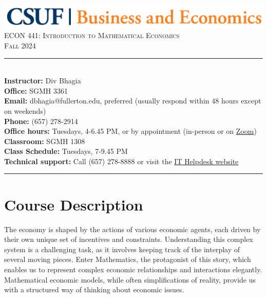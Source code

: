 \documentclass{./../Latex/syllabus}
\begin{document}
\begin{center}
\includegraphics[scale=0.22]{CBE-Wordmark-CMYK} \\ \vspace{0.5em}
{\large \textsc{ECON 441: Introduction to Mathematical Economics}} \\
{\large \textsc{Fall 2024}}
\end{center}

\begin{center}
\begin{minipage}[t]{\textwidth}
\rule{\textwidth}{0.5pt} \\
\textbf{Instructor:} Div Bhagia \\
\textbf{Office:} SGMH 3361 \\
\textbf{Email:} dbhagia@fullerton.edu, preferred (usually respond within 48 hours except on weekends) \\
\textbf{Phone:} (657) 278-2914 \\
\textbf{Office hours:} Tuesdays, 4-6.45 PM, or by appointment (in-person or on \href{https://fullerton.zoom.us/j/81895171931}{Zoom}) \\
\textbf{Classroom:} SGMH 1308 \\
\textbf{Class Schedule:} Tuesdays, 7-9.45 PM \\
\textbf{Technical support:} Call (657) 278-8888 or visit the \href{https://www.fullerton.edu/it/students/helpdesk/index.php}{IT Helpdesk website} \\
\rule{\textwidth}{0.5pt} 
\end{minipage}
\end{center}

\vspace{0.1em}
\section*{Course Description}


The economy is shaped by the actions of various economic agents, each driven by their own unique set of incentives and constraints. Understanding this complex system is a challenging task, as it involves keeping track of the interplay of several moving pieces. Enter Mathematics, the protagonist of this story, which enables us to represent complex economic relationships and interactions elegantly. Mathematical economic models, while often simplifications of reality, provide us with a structured way of thinking about economic issues.
\end{document}

